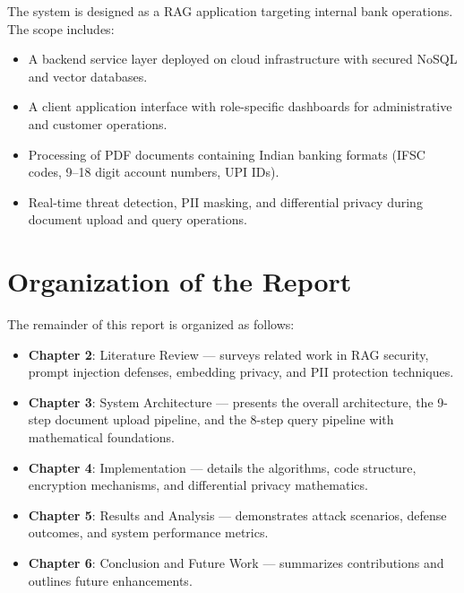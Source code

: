 The system is designed as a RAG application targeting internal bank operations. The scope includes:

\begin{itemize}
    \item A backend service layer deployed on cloud infrastructure with secured NoSQL and vector databases.
    \item A client application interface with role-specific dashboards for administrative and customer operations.
    \item Processing of PDF documents containing Indian banking formats (IFSC codes, 9--18 digit account numbers, UPI IDs).
    \item Real-time threat detection, PII masking, and differential privacy during document upload and query operations.
\end{itemize}

\section{Organization of the Report}

The remainder of this report is organized as follows:

\begin{itemize}
    \item \textbf{Chapter 2}: Literature Review --- surveys related work in RAG security, prompt injection defenses, embedding privacy, and PII protection techniques.
    \item \textbf{Chapter 3}: System Architecture --- presents the overall architecture, the 9-step document upload pipeline, and the 8-step query pipeline with mathematical foundations.
    \item \textbf{Chapter 4}: Implementation --- details the algorithms, code structure, encryption mechanisms, and differential privacy mathematics.
    \item \textbf{Chapter 5}: Results and Analysis --- demonstrates attack scenarios, defense outcomes, and system performance metrics.
    \item \textbf{Chapter 6}: Conclusion and Future Work --- summarizes contributions and outlines future enhancements.
\end{itemize}

